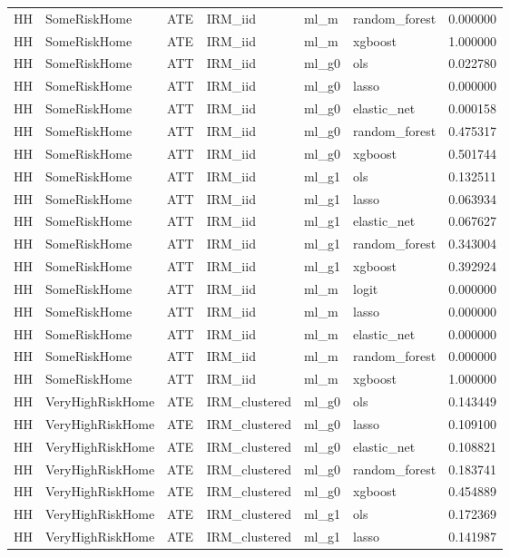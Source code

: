 \begin{longtable}{llllllr}
HH & SomeRiskHome & ATE & IRM\_iid & ml\_m & random\_forest & 0.000000 \\
HH & SomeRiskHome & ATE & IRM\_iid & ml\_m & xgboost & 1.000000 \\
HH & SomeRiskHome & ATT & IRM\_iid & ml\_g0 & ols & 0.022780 \\
HH & SomeRiskHome & ATT & IRM\_iid & ml\_g0 & lasso & 0.000000 \\
HH & SomeRiskHome & ATT & IRM\_iid & ml\_g0 & elastic\_net & 0.000158 \\
HH & SomeRiskHome & ATT & IRM\_iid & ml\_g0 & random\_forest & 0.475317 \\
HH & SomeRiskHome & ATT & IRM\_iid & ml\_g0 & xgboost & 0.501744 \\
HH & SomeRiskHome & ATT & IRM\_iid & ml\_g1 & ols & 0.132511 \\
HH & SomeRiskHome & ATT & IRM\_iid & ml\_g1 & lasso & 0.063934 \\
HH & SomeRiskHome & ATT & IRM\_iid & ml\_g1 & elastic\_net & 0.067627 \\
HH & SomeRiskHome & ATT & IRM\_iid & ml\_g1 & random\_forest & 0.343004 \\
HH & SomeRiskHome & ATT & IRM\_iid & ml\_g1 & xgboost & 0.392924 \\
HH & SomeRiskHome & ATT & IRM\_iid & ml\_m & logit & 0.000000 \\
HH & SomeRiskHome & ATT & IRM\_iid & ml\_m & lasso & 0.000000 \\
HH & SomeRiskHome & ATT & IRM\_iid & ml\_m & elastic\_net & 0.000000 \\
HH & SomeRiskHome & ATT & IRM\_iid & ml\_m & random\_forest & 0.000000 \\
HH & SomeRiskHome & ATT & IRM\_iid & ml\_m & xgboost & 1.000000 \\
HH & VeryHighRiskHome & ATE & IRM\_clustered & ml\_g0 & ols & 0.143449 \\
HH & VeryHighRiskHome & ATE & IRM\_clustered & ml\_g0 & lasso & 0.109100 \\
HH & VeryHighRiskHome & ATE & IRM\_clustered & ml\_g0 & elastic\_net & 0.108821 \\
HH & VeryHighRiskHome & ATE & IRM\_clustered & ml\_g0 & random\_forest & 0.183741 \\
HH & VeryHighRiskHome & ATE & IRM\_clustered & ml\_g0 & xgboost & 0.454889 \\
HH & VeryHighRiskHome & ATE & IRM\_clustered & ml\_g1 & ols & 0.172369 \\
HH & VeryHighRiskHome & ATE & IRM\_clustered & ml\_g1 & lasso & 0.141987 \\

\end{longtable}
